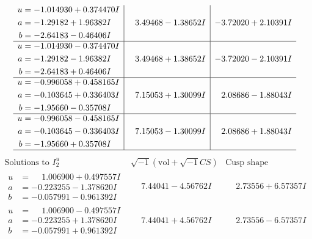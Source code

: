 \documentclass[1p]{elsarticle_modified}
\theoremstyle{definition}
\newcommand{\I}{\sqrt{-1}}
\begin{document}
$$\begin{array}{c|c|c}
\begin{aligned}
u &= -1.014930 + 0.374470 I \\
a &= -1.29182 + 1.96382 I \\
b &= -2.64183 - 0.46406 I\end{aligned}
 & \phantom{-}3.49468 - 1.38652 I & -3.72020 + 2.10391 I \\ \hline\begin{aligned}
u &= -1.014930 - 0.374470 I \\
a &= -1.29182 - 1.96382 I \\
b &= -2.64183 + 0.46406 I\end{aligned}
 & \phantom{-}3.49468 + 1.38652 I & -3.72020 - 2.10391 I \\ \hline\begin{aligned}
u &= -0.996058 + 0.458165 I \\
a &= -0.103645 + 0.336403 I \\
b &= -1.95660 - 0.35708 I\end{aligned}
 & \phantom{-}7.15053 + 1.30099 I & \phantom{-}2.08686 - 1.88043 I \\ \hline\begin{aligned}
u &= -0.996058 - 0.458165 I \\
a &= -0.103645 - 0.336403 I \\
b &= -1.95660 + 0.35708 I\end{aligned}
 & \phantom{-}7.15053 - 1.30099 I & \phantom{-}2.08686 + 1.88043 I\\
 \hline 
 \end{array}$$\newpage$$\begin{array}{c|c|c}  
\text{Solutions to }I^u_{2}& \I (\text{vol} + \sqrt{-1}CS) & \text{Cusp shape}\\
 \hline 
\begin{aligned}
u &= \phantom{-}1.006900 + 0.497557 I \\
a &= -0.223255 - 1.378620 I \\
b &= -0.057991 - 0.961392 I\end{aligned}
 & \phantom{-}7.44041 - 4.56762 I & \phantom{-}2.73556 + 6.57357 I \\ \hline\begin{aligned}
u &= \phantom{-}1.006900 - 0.497557 I \\
a &= -0.223255 + 1.378620 I \\
b &= -0.057991 + 0.961392 I\end{aligned}
 & \phantom{-}7.44041 + 4.56762 I & \phantom{-}2.73556 - 6.57357 I \\ \hline\begin{aligned}

\end{aligned}
\end{array}$$
\end{document}
